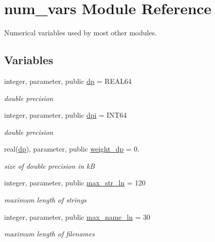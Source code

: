 \hypertarget{namespacenum__vars}{}\section{num\+\_\+vars Module Reference}
\label{namespacenum__vars}


Numerical variables used by most other modules.  


\subsection*{Variables}
\begin{DoxyCompactItemize}
\item 
integer, parameter, public \hyperlink{namespacenum__vars_a03802aa2bd86439d7a9370836fabf3f2}{dp} = R\+E\+A\+L64
\begin{DoxyCompactList}\small\item\em double precision \end{DoxyCompactList}\item 
integer, parameter, public \hyperlink{namespacenum__vars_a7e4915cb055749f1170afaa77b055cd5}{dpi} = I\+N\+T64
\begin{DoxyCompactList}\small\item\em double precision \end{DoxyCompactList}\item 
real(\hyperlink{namespacenum__vars_a03802aa2bd86439d7a9370836fabf3f2}{dp}), parameter, public \hyperlink{namespacenum__vars_ad5be06791ebf0ca75fc6dc7339916ae8}{weight\+\_\+dp} = 0.
\begin{DoxyCompactList}\small\item\em size of double precision in kB \end{DoxyCompactList}\item 
integer, parameter, public \hyperlink{namespacenum__vars_a3ff2bb983ee80a6735277d6789e6ce7c}{max\+\_\+str\+\_\+ln} = 120
\begin{DoxyCompactList}\small\item\em maximum length of strings \end{DoxyCompactList}\item 
integer, parameter, public \hyperlink{namespacenum__vars_a1b79c43315241705b429443dfe798837}{max\+\_\+name\+\_\+ln} = 30
\begin{DoxyCompactList}\small\item\em maximum length of filenames \end{DoxyCompactList}\item 

\end{DoxyCompactItemize}
